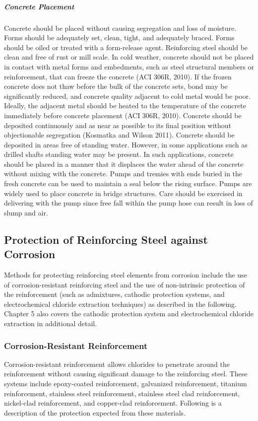 \subparagraph{Concrete Placement}
Concrete should be placed without causing segregation and loss of moisture. Forms should be adequately set,
clean, tight, and adequately braced. Forms should be oiled or treated with a form-release agent. Reinforcing steel
should be clean and free of rust or mill scale. In cold weather, concrete should not be placed in contact with metal
forms and embedments, such as steel structural members or reinforcement, that can freeze the concrete (ACI 306R,
2010). If the frozen concrete does not thaw before the bulk of the concrete sets, bond may be significantly reduced,
and concrete quality adjacent to cold metal would be poor. Ideally, the adjacent metal should be heated to the
temperature of the concrete immediately before concrete placement (ACI 306R, 2010). Concrete should be deposited
continuously and as near as possible to its final position without objectionable segregation (Kosmatka and Wilson
2011). Concrete should be deposited in areas free of standing water. However, in some applications such as drilled
shafts standing water may be present. In such applications, concrete should be placed in a manner that it displaces
the water ahead of the concrete without mixing with the concrete. Pumps and tremies with ends buried in the fresh
concrete can be used to maintain a seal below the rising surface. Pumps are widely used to place concrete in bridge
structures. Care should be exercised in delivering with the pump since free fall within the pump hose can result in
loss of slump and air.


\subsection{Protection of Reinforcing Steel against Corrosion}\label{subsec:protection-reinforcing-steel}
Methods for protecting reinforcing steel elements from corrosion include the use of corrosion-resistant
reinforcing steel and the use of non-intrinsic protection of the reinforcement (such as admixtures, cathodic protection
systems, and electrochemical chloride extraction techniques) as described in the following. Chapter 5 also covers the
cathodic protection system and electrochemical chloride extraction in additional detail.

\subsubsection{Corrosion-Resistant Reinforcement}
Corrosion-resistant reinforcement allows chlorides to penetrate around the reinforcement without causing
significant damage to the reinforcing steel. These systems include epoxy-coated reinforcement, galvanized
reinforcement, titanium reinforcement, stainless steel reinforcement, stainless steel clad reinforcement, nickel-clad
reinforcement, and copper-clad reinforcement. Following is a description of the protection expected from these
materials.
